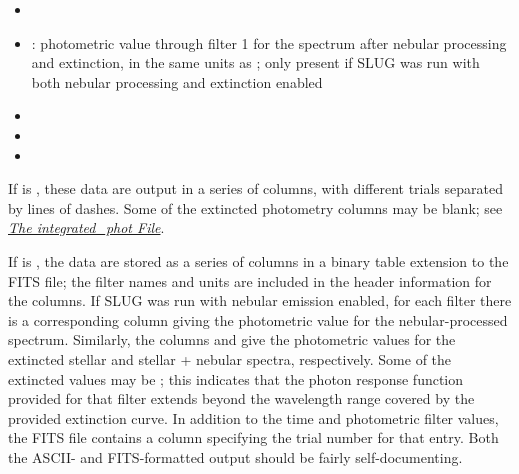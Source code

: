 \documentclass[letterpaper,10pt,english]{sphinxmanual}
\begin{document}
\begin{itemize}
\item {} 

\item {} 
: photometric value through filter 1 for the spectrum after nebular processing and extinction, in the same units as ; only present if SLUG was run with both nebular processing and extinction enabled

\item {} 

\item {} 

\item {} 

\end{itemize}

If  is , these data are output in a series of columns, with different trials separated by lines of dashes. Some of the extincted photometry columns may be blank; see {\hyperref[output:ssec-int-phot-file]{\emph{The integrated\_phot File}}}.

If  is , the data are stored as a series of
columns in a binary table extension to the FITS file; the filter names
and units are included in the header information for the columns. If
SLUG was run with nebular emission enabled, for each filter 
there is a corresponding column  giving the photometric
value for the nebular-processed spectrum. Similarly, the columns
 and  give the photometric values
for the extincted stellar and stellar + nebular spectra, respectively.
Some of the extincted values may be ; this
indicates that the photon response function provided for that filter
extends beyond the wavelength range covered by the provided extinction
curve. In addition to the time and photometric filter values, the FITS
file contains a column specifying the trial number for that
entry. Both the ASCII- and FITS-formatted output should be fairly
self-documenting.
\end{document}
